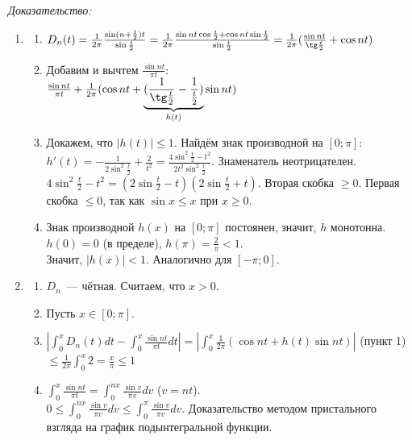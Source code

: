 \documentclass[paper=a4, fontsize=17pt]{article}
\begin{document}
\emph{Доказательство:}

\begin{enumerate}
    \item \begin{enumerate}
        \item $D_n(t) = \frac{1}{2\pi} \frac{\sin(n+\frac{1}{2})t}{\sin\frac{t}{2}} =
            \frac{1}{2\pi} \frac{\sin nt \cos \frac{t}{2} + \cos nt \sin \frac{t}{2}}{\sin\frac{t}{2}} =
            \frac{1}{2\pi}(\frac{\sin nt}{\tg\frac{t}{2}} + \cos nt)$
        \item Добавим и вычтем $\frac{\sin nt}{\pi t}$:\\
            $\frac{\sin nt}{\pi t} + \frac{1}{2\pi} (\cos nt + \underbrace{(\frac{1}{\tg \frac{t}{2}} - \frac{1}{\frac{t}{2}})}_{h(t)} \sin nt)$
        \item Докажем, что $|h(t)| \leq 1$. Найдём знак производной на $[0;\pi]$:\\
            $h'(t) = -\frac{1}{2\sin^2 \frac{t}{2}} + \frac{2}{t^2} = \frac{4\sin^2\frac{t}{2} - t^2}{2t^2\sin^2 \frac{t}{2}}$.
            Знаменатель неотрицателен.\\
            $4\sin^2\frac{t}{2} - t^2 = (2\sin\frac{t}{2} - t)(2\sin\frac{t}{2} + t)$. Вторая скобка $\geq 0$.
            Первая скобка $\leq 0$, так как $\sin x \leq x$ при $x \geq 0$.
        \item Знак производной $h(x)$ на $[0;\pi]$ постоянен, значит, $h$ монотонна. $h(0)=0$ (в пределе), $h(\pi)=\frac{2}{\pi} < 1$.\\
            Значит, $|h(x)| < 1$. Аналогично для $[-\pi;0]$.
    \end{enumerate}
    \item \begin{enumerate}
        \item $D_n$~--- чётная. Считаем, что $x > 0$.
        \item Пусть $x \in [0;\pi]$.
        \item $|\int_0^x D_n(t) dt - \int_0^x \frac{\sin nt}{\pi t}dt| = |\int_0^x \frac{1}{2\pi}(\cos nt + h(t)\sin nt)|$
        (пункт 1)\\
            $\leq \frac{1}{2\pi}\int_0^x 2 = \frac{x}{\pi} \leq 1$
        \item $\int_0^x \frac{\sin nt}{\pi t} = \int_0^{nx} \frac{\sin v}{\pi v} dv$ ($v = nt$).\\
            $0 \leq \int_0^{nx} \frac{\sin v}{\pi v} dv \leq \int_0^\pi \frac{\sin v}{\pi v} dv$.
            Доказательство методом пристального взгляда на график подынтегральной функции.\\

\end{enumerate}
\end{enumerate}
\end{document}
